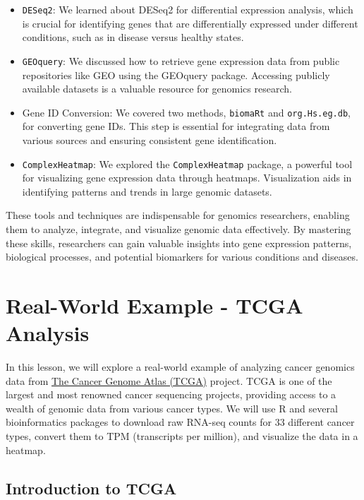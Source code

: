 \documentclass[
]{book}
\begin{document}
\begin{itemize}
\item
  \texttt{DESeq2}: We learned about DESeq2 for differential expression analysis, which is crucial for identifying genes that are differentially expressed under different conditions, such as in disease versus healthy states.
\item
  \texttt{GEOquery}: We discussed how to retrieve gene expression data from public repositories like GEO using the GEOquery package. Accessing publicly available datasets is a valuable resource for genomics research.
\item
  Gene ID Conversion: We covered two methods, \texttt{biomaRt} and \texttt{org.Hs.eg.db}, for converting gene IDs. This step is essential for integrating data from various sources and ensuring consistent gene identification.
\item
  \texttt{ComplexHeatmap}: We explored the \texttt{ComplexHeatmap} package, a powerful tool for visualizing gene expression data through heatmaps. Visualization aids in identifying patterns and trends in large genomic datasets.
\end{itemize}

These tools and techniques are indispensable for genomics researchers, enabling them to analyze, integrate, and visualize genomic data effectively. By mastering these skills, researchers can gain valuable insights into gene expression patterns, biological processes, and potential biomarkers for various conditions and diseases.

\hypertarget{real-world-example---tcga-analysis}{%
\section{Real-World Example - TCGA Analysis}\label{real-world-example---tcga-analysis}}

In this lesson, we will explore a real-world example of analyzing cancer genomics data from \href{https://www.cancer.gov/ccg/research/genome-sequencing/tcga}{The Cancer Genome Atlas (TCGA)} project. TCGA is one of the largest and most renowned cancer sequencing projects, providing access to a wealth of genomic data from various cancer types. We will use R and several bioinformatics packages to download raw RNA-seq counts for 33 different cancer types, convert them to TPM (transcripts per million), and visualize the data in a heatmap.

\hypertarget{introduction-to-tcga}{%
\subsection{Introduction to TCGA}\label{introduction-to-tcga}}
\end{document}
